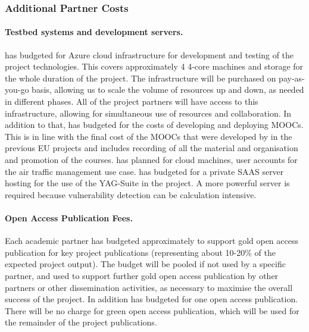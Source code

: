 \documentclass[a4paper,11pt]{article}
\begin{document}

\subsubsection{Additional Partner Costs}
\vspace{-6pt}

\paragraph{Testbed systems and development servers.}
\UODshort{} has budgeted  for Azure cloud infrastructure for development and testing of the project technologies. This covers approximately 4 4-core machines and storage for the whole duration of the project. The infrastructure will be purchased on pay-as-you-go basis, allowing us to scale the volume of resources up and down, as needed in different phases. All of the project partners will have access to this infrastructure, allowing for simultaneous use of resources and collaboration. In addition to that, \UODshort{} has budgeted  for the costs of developing and deploying MOOCs. This is in line with the final cost of the MOOCs that were developed by \UODshort{} in the previous EU projects and includes recording of all the material and organisation and promotion of the courses. \FRQshort{} has planned  for cloud machines, user accounts for the air traffic management use case. \YAGshort has budgeted  for a private SAAS server hosting for the use of the  YAG-Suite in the project. A more powerful server is required because vulnerability detection can be calculation intensive.

\paragraph{Open Access Publication Fees.}
Each academic partner has budgeted approximately  to support gold open access publication for key project publications (representing about 10-20\% of the expected project output). The budget will be pooled if not used by a specific partner, and used to support further gold open access publication by other partners or other dissemination activities, as necessary to maximise the overall success of the project. In addition \FRQshort{} has budgeted  for one open access publication. There will be no charge for green open access publication, which will be used for the remainder of the project publications.
\end{document}
